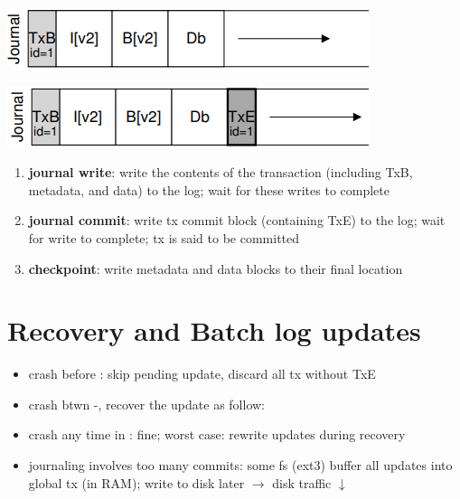 \begin{minipage}{.5\linewidth}
  \includegraphics[width=\linewidth]{imgs/jn_dj3}
\end{minipage}
\begin{minipage}{.5\linewidth}
  \includegraphics[width=\linewidth]{imgs/jn_dj4}
\end{minipage}
\begin{enumerate}
\item \textbf{journal write}: write the contents of the transaction (including TxB,
metadata, and data) to the log; wait for these writes to complete
\item \textbf{journal commit}: write tx commit block (containing
TxE) to the log; wait for write to complete; tx is said to be committed
\item \textbf{checkpoint}: write metadata and data blocks to their final location
\end{enumerate}
\section*{Recovery and Batch log updates}
\begin{itemize}
\item crash before : skip pending update, discard all tx without TxE
\item crash btwn -, recover the update as follow:
\item crash any time in : fine; worst case: rewrite updates during recovery
\item journaling involves too many commits: some fs (ext3) buffer all updates into global tx (in RAM); write to disk later $\to$ disk traffic $\downarrow$
\end{itemize}
